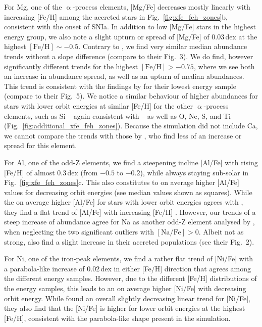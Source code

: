 \documentclass[fleqn,usenatbib]{mnras}
\begin{document}
For Mg, one of the $\upalpha$-process elements, [Mg/Fe] decreases mostly linearly with increasing [Fe/H] among the accreted stars in Fig.~\ref{fig:xfe_feh_zones}b, consistent with the onset of SNIa. In addition to low [Mg/Fe] stars in the highest energy group, we also note a slight upturn or spread of [Mg/Fe] of 0.03\,dex at the highest $\mathrm{[Fe/H]} \sim -0.5$. Contrary to \citet{Skuladottir2025}, we find very similar median abundance trends without a slope difference (compare to their Fig.~3). We do find, however significantly different trends for the highest $\mathrm{[Fe/H]} > -0.75$, where we see both an increase in abundance spread, as well as an upturn of median abundances. This trend is consistent with the findings by \citet{Skuladottir2025} for their lowest energy sample (compare to their Fig.~5). We notice a similar behaviour of higher abundances for stars with lower orbit energies at similar [Fe/H] for the other $\upalpha$-process elements, such as Si -- again consistent with \citet{Skuladottir2025} -- as well as O, Ne, S, and Ti (Fig.~\ref{fig:additional_xfe_feh_zones}). Because the simulation did not include Ca, we cannot compare the trends with those by \citet{Skuladottir2025}, who find less of an increase or spread for this element.

For Al, one of the odd-Z elements, we find a steepening incline [Al/Fe] with rising [Fe/H] of almost 0.3\,dex (from $-0.5$ to $-0.2$), while always staying sub-solar in Fig.~\ref{fig:xfe_feh_zones}c. This also constitutes to on average higher [Al/Fe] values for decreasing orbit energies (see median values shown as squares). While the on average higher [Al/Fe] for stars with lower orbit energies agrees with \citet{Skuladottir2025}, they find a flat trend of [Al/Fe] with increasing [Fe/H] \citep[see also][]{Feuillet2021, Ernandes2025}. However, our trends of a steep increase of abundance agree for Na as another odd-Z element analysed by \citet[][see their Fig.~6]{Skuladottir2025}, when neglecting the two significant outliers with $\mathrm{[Na/Fe]} > 0$. Albeit not as strong, \citet{Belokurov2022} also find a slight increase in their accreted populations (see their Fig.~2).

For Ni, one of the iron-peak elements, we find a rather flat trend of [Ni/Fe] with a parabola-like increase of 0.02\,dex in either [Fe/H] direction that agrees among the different energy samples. However, due to the different [Fe/H] distributions of the energy samples, this leads to an on average higher [Ni/Fe] with decreasing orbit energy. While \citet{Skuladottir2025} found an overall slightly decreasing linear trend for [Ni/Fe], they also find that the [Ni/Fe] is higher for lower orbit energies at the highest [Fe/H], consistent with the parabola-like shape present in the simulation.
\end{document}
